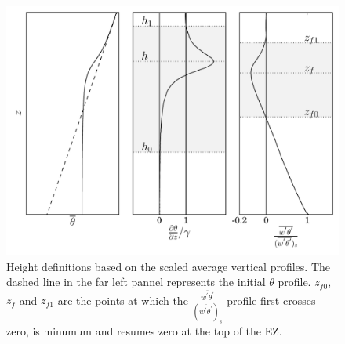 
\begin{figure}[htbp]
    \centering
    
    \includegraphics[scale=.5]{figures/height_defs.pdf}
    \caption[Height Definitions]{Height definitions based on the scaled average vertical profiles. The dashed line in the far left pannel represents the initial $\overline{\theta}$ profile. $z_{f0}$, $z_{f}$ and $z_{f1}$ are the points at which the $\frac{\overline{w^{'}\theta^{'}}}{(\overline{w^{'}\theta^{'}})_{s}}$ profile first crosses zero, is minumum and resumes zero at the top of the EZ.}
    \label{fig:hdefs} 
\end{figure}

